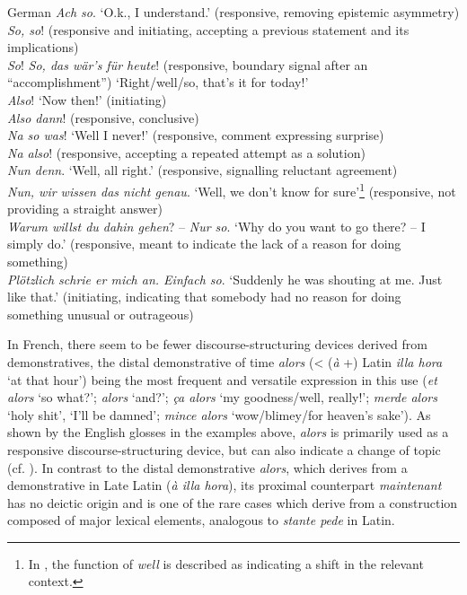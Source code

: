 \documentclass[output=paper,colorlinks,citecolor=brown]{langscibook}
\begin{document}
\ea German\label{ex:koenig:13}
\ea \textit{Ach so}. ‘O.k., I understand.’ (responsive, removing epistemic asymmetry)\\

\ex \textit{So, so}! (responsive and initiating, accepting a previous statement and its implications)\\

\ex \textit{So}! \textit{So, das wär’s für heute}! (responsive, boundary signal after an “accomplishment”) ‘Right/well/so, that’s it for today!’\\

\ex \textit{Also}! ‘Now then!’ (initiating)\\

\ex \textit{Also dann}! (responsive, conclusive)\\

\ex \textit{Na so was}! ‘Well I never!’ (responsive, comment expressing surprise) \\

\ex \textit{Na also}! (responsive, accepting a repeated attempt as a solution)\\

\ex \textit{Nun denn}. ‘Well, all right.’ (responsive, signalling reluctant agreement)\\

\ex \textit{Nun, wir wissen das nicht genau}. ‘Well, we don’t know for sure’\footnote{In \citet[450]{Jucker1993}, the function of \textit{well} is described as indicating a shift in the relevant context.} (responsive, not providing a straight answer) \\

\ex \textit{Warum willst du dahin gehen}? – \textit{Nur so}. ‘Why do you want to go there? – I simply do.’ (responsive, meant to indicate the lack of a reason for doing something)\\

\ex \textit{Plötzlich schrie er mich an. Einfach so}. ‘Suddenly he was shouting at me. Just like that.’ (initiating, indicating that somebody had no reason for doing something unusual or outrageous) 
\z
\z

In French, there seem to be fewer discourse-structuring devices derived from demonstratives, the distal demonstrative of time \textit{alors} (<  (\textit{à} +) Latin \textit{illa hora} ‘at that hour’) being the most frequent and versatile expression in this use (\textit{et alors} ‘so what?’; \textit{alors} ‘and?’; \textit{ça alors} ‘my goodness/well, really!’; \textit{merde alors} ‘holy shit’, ‘I’ll be damned’; \textit{mince alors} ‘wow/blimey/for heaven’s sake’). As shown by the English glosses in the examples above, \textit{alors} is primarily used as a responsive discourse-structuring device, but can also indicate a change of topic (cf. \citealt{DegandFagard2011}). In contrast to the distal demonstrative \textit{alors}, which derives from a demonstrative in Late Latin (\textit{à illa hora}), its proximal counterpart \textit{maintenant} has no deictic origin and is one of the rare cases which derive from a construction composed of major lexical elements, analogous to \textit{stante pede} in Latin.
\end{document}
